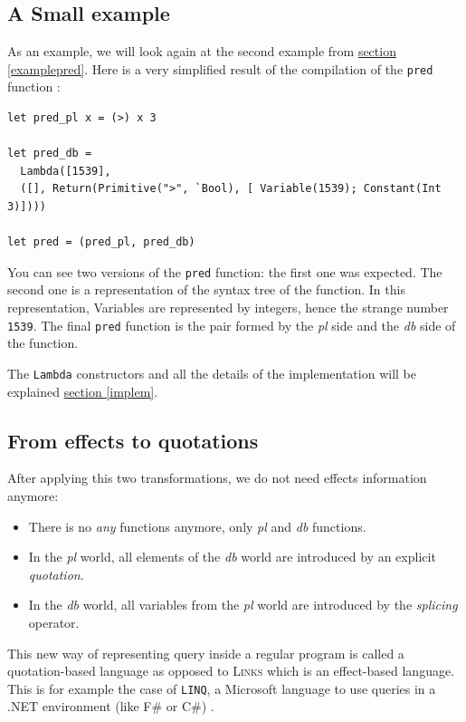\documentclass[11pt]{article}
\newcommand\mysc[1]{{\rmfamily\textsc{#1}}\xspace}
\newcommand\links{\mysc{Links}}
\newcommand\refsec[1]{\hyperref[#1]{section \ref*{#1}}}
\newcommand\code[1]{{\tt #1}}
\newcommand\effect[1]{{\em #1}}
\newcommand\ocamlc[1]{\lstinline[language={[Objective]Caml},basicstyle=\ttfamily\normalsize]{#1}}
\begin{document}
\subsection{A Small example}

As an example, we will look again at the second example from \refsec{examplepred}. Here is a very simplified result of the compilation of the \code{pred} function :

\begin{lstlisting}[language={[Objective]Caml}]
let pred_pl x = (>) x 3

let pred_db =
  Lambda([1539], 
  ([], Return(Primitive(">", `Bool), [ Variable(1539); Constant(Int 3)])))

let pred = (pred_pl, pred_db)
\end{lstlisting}

You can see two versions of the \code{pred} function: the first one was expected. The second one is a representation of the syntax tree of the function. In this representation, Variables are represented by integers, hence the strange number \code{1539}. The final \code{pred} function is the pair formed by the \effect{pl} side and the \effect{db} side of the function.

The \ocamlc{Lambda} constructors and all the details of the implementation will be explained \refsec{implem}.

\subsection{From effects to quotations}

After applying this two transformations, we do not need effects information anymore:
\begin{itemize}
\item There is no \effect{any} functions anymore, only \effect{pl} and \effect{db} functions.
\item In the \effect{pl} world, all elements of the \effect{db} world are introduced by an explicit \emph{quotation}.
\item In the \effect{db} world, all variables from the \effect{pl} world are introduced by the \emph{splicing} operator.
\end{itemize}

This new way of representing query inside a regular program is called a quotation-based language as opposed to \links which is an effect-based language. 
This is for example the case of {\tt LINQ}, a Microsoft language to use queries in a .NET environment (like F\# or C\#) \cite{linq}. 
\end{document}
